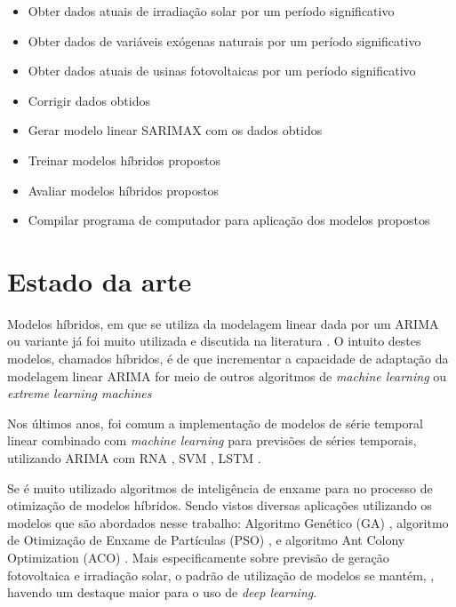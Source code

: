 \begin{itemize}
    \item Obter dados atuais de irradiação solar por um período significativo
    \item Obter dados de variáveis exógenas naturais por um período significativo
    \item Obter dados atuais de usinas fotovoltaicas por um período significativo
    \item Corrigir dados obtidos
    \item Gerar modelo linear SARIMAX com os dados obtidos
    \item Treinar modelos híbridos propostos
    \item Avaliar modelos híbridos propostos
    \item Compilar programa de computador para aplicação dos modelos propostos
\end{itemize}

\section{Estado da arte}

Modelos híbridos, em que se utiliza da modelagem linear dada por um ARIMA ou variante já foi muito utilizada e discutida na literatura \cite{zhang2003time, khashei2010artificial, babu2014moving, de2014hybrid, de2016hybrid, domingos2019intelligent}. O intuito destes modelos, chamados híbridos, é de que incrementar a capacidade de adaptação da modelagem linear ARIMA for meio de outros algoritmos de \textit{machine learning} ou \textit{extreme learning machines} \cite{yu2020hybrid}

Nos últimos anos, foi comum a implementação de modelos de série temporal linear combinado com \textit{machine learning} para previsões de séries temporais, utilizando ARIMA com RNA \cite{xiong2017hybrid}, SVM \cite{domingos2019intelligent}, LSTM \cite{choi2018stock}.

Se é muito utilizado algoritmos de inteligência de enxame para no processo de otimização de modelos híbridos. Sendo vistos diversas aplicações utilizando os modelos que são abordados nesse trabalho: Algoritmo Genético (GA) \cite{huang2012hybrid}, algoritmo de Otimização de Enxame de Partículas (PSO) \cite{bagheri2014financial, pradeepkumar2017forecasting}, e algoritmo Ant Colony Optimization (ACO) \cite{shen2013optimal}. Mais especificamente sobre previsão de geração fotovoltaica e irradiação solar, o padrão de utilização de modelos se mantém, \cite{sobri2018solar, wang2019review}, havendo um destaque maior para o uso de \textit{deep learning}.



